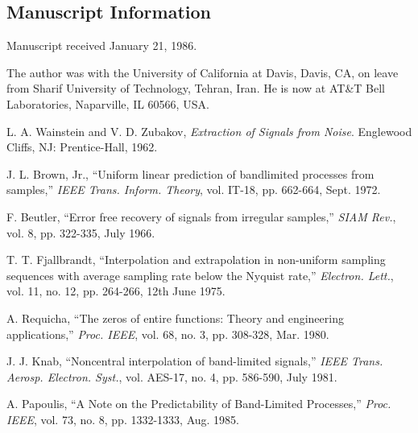 \documentclass{article}
\newcommand{\tmem}[1]{{\em #1\/}}
\begin{document}
\subsection*{Manuscript Information}

Manuscript received January 21, 1986.

The author was with the University of California at Davis, Davis, CA, on leave
from Sharif University of Technology, Tehran, Iran. He is now at AT\&T Bell
Laboratories, Naparville, IL 60566, USA.

\begin{thebibliography}{9}
  {}L. A. Wainstein and V. D. Zubakov,
  {\tmem{Extraction of Signals from Noise}}. Englewood Cliffs, NJ:
  Prentice-Hall, 1962.
  
  {}J. L. Brown, Jr., ``Uniform linear prediction of
  bandlimited processes from samples,'' {\tmem{IEEE Trans. Inform. Theory}},
  vol. IT-18, pp. 662-664, Sept. 1972.
  
  {}F. Beutler, ``Error free recovery of signals from
  irregular samples,'' {\tmem{SIAM Rev.}}, vol. 8, pp. 322-335, July 1966.
  
  {}T. T. Fjallbrandt, ``Interpolation and
  extrapolation in non-uniform sampling sequences with average sampling rate
  below the Nyquist rate,'' {\tmem{Electron. Lett.}}, vol. 11, no. 12, pp.
  264-266, 12th June 1975.
  
  {}A. Requicha, ``The zeros of entire functions: Theory
  and engineering applications,'' {\tmem{Proc. IEEE}}, vol. 68, no. 3, pp.
  308-328, Mar. 1980.
  
  {}J. J. Knab, ``Noncentral interpolation of band-limited
  signals,'' {\tmem{IEEE Trans. Aerosp. Electron. Syst.}}, vol. AES-17, no. 4,
  pp. 586-590, July 1981.
  
  {}A. Papoulis, ``A Note on the Predictability of
  Band-Limited Processes,'' {\tmem{Proc. IEEE}}, vol. 73, no. 8, pp.
  1332-1333, Aug. 1985.
\end{thebibliography}
\end{document}
